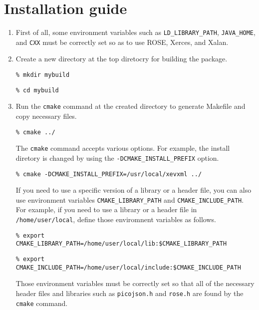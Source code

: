 \section{Installation guide}
\begin{enumerate}
 \item First of all, some environment variables such as
       \texttt{LD\_LIBRARY\_PATH}, \texttt{JAVA\_HOME}, and \texttt{CXX}
       must be correctly set so as to use ROSE, Xerces, and Xalan.


 \item Create a new directory at the top diretocry for building the package.

       \vspace{5mm}
       \texttt{\% mkdir mybuild}

       \texttt{\% cd mybuild}
       \vspace{5mm}

 \item Run the \texttt{cmake} command at the created directory to
       generate Makefile and copy necessary files.

       \vspace{5mm}
       \texttt{\% cmake ../}
       \vspace{5mm}

       The \texttt{cmake} command accepts various options. For example,
       the install diretory is changed by using the
       \texttt{-DCMAKE\_INSTALL\_PREFIX} option.

       \vspace{5mm}
       \texttt{\% cmake -DCMAKE\_INSTALL\_PREFIX=/usr/local/xevxml ../}
       \vspace{5mm}

       If you need to use a specific version of a library or a header
       file, you can also use environment variables
       \texttt{CMAKE\_LIBRARY\_PATH} and \texttt{CMAKE\_INCLUDE\_PATH}.
       For example, if you need to use a library or a header file in
       \texttt{/home/user/local}, define those enviromnent variables as
       follows.

       \vspace{5mm}
       \texttt{\% export CMAKE\_LIBRARY\_PATH=/home/user/local/lib:\$CMAKE\_LIBRARY\_PATH}

       \texttt{\% export CMAKE\_INCLUDE\_PATH=/home/user/local/include:\$CMAKE\_INCLUDE\_PATH}
       \vspace{5mm}

      Those environment variables must be correctly set so that all of
      the necessary header files and libraries such as
      \texttt{picojson.h} and \texttt{rose.h} are found by the
       \texttt{cmake} command.


\end{enumerate}

